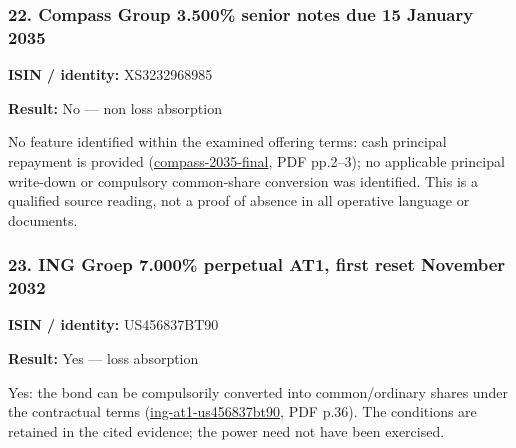 \documentclass[
  11pt,
]{article}
\begin{document}
\begin{minipage}{\linewidth}

\hypertarget{compass-group-3.500-senior-notes-due-15-january-2035}{%
\subsubsection{22. Compass Group 3.500\% senior notes due 15 January
2035}\label{compass-group-3.500-senior-notes-due-15-january-2035}}

\textbf{ISIN / identity:} XS3232968985

\textbf{Result:} No --- non loss absorption

No feature identified within the examined offering terms: cash principal
repayment is provided
(\href{https://www.compass-group.com/content/dam/compass-group/corporate/Investors/debt-investors/emtn-2026/Final\%20Terms\%20\%E2\%80\%93\%20EUR\%20Notes\%20Due\%202035.pdf}{compass-2035-final},
PDF pp.2--3); no applicable principal write-down or compulsory
common-share conversion was identified. This is a qualified source
reading, not a proof of absence in all operative language or documents.

\end{minipage}
\par\addvspace{1.1em}

\begin{minipage}{\linewidth}

\hypertarget{ing-groep-7.000-perpetual-at1-first-reset-november-2032}{%
\subsubsection{23. ING Groep 7.000\% perpetual AT1, first reset November
2032}\label{ing-groep-7.000-perpetual-at1-first-reset-november-2032}}

\textbf{ISIN / identity:} US456837BT90

\textbf{Result:} Yes --- loss absorption

Yes: the bond can be compulsorily converted into common/ordinary shares
under the contractual terms
(\href{https://ing.com/binaries/content/assets/documents/files/us456837bt90.pdf}{ing-at1-us456837bt90},
PDF p.36). The conditions are retained in the cited evidence; the power
need not have been exercised.

\end{minipage}
\par\addvspace{1.1em}
\end{document}
